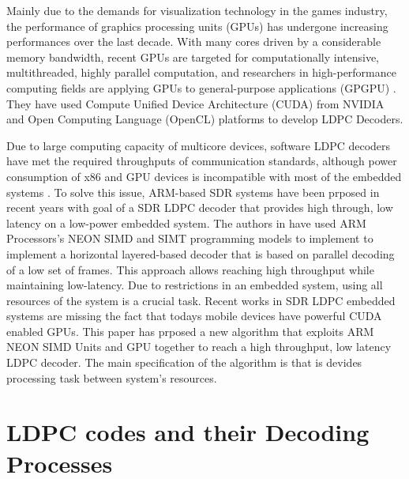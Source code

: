 \documentclass[conference]{IEEEtran}
\begin{document}
Mainly due to the demands for visualization technology in the games industry, the performance of graphics processing units (GPUs) has undergone increasing performances over the last decade. With many cores driven by a considerable memory bandwidth, recent GPUs are targeted for computationally intensive, multithreaded, highly parallel computation, and researchers in high-performance computing fields are applying GPUs to general-purpose applications (GPGPU) \cite{art_gpu_0,art_cuda_openmp, art_memory_coalesced, art_ldpc_OpenCl, art_optimize_0, art_layered1}. They have used Compute Unified Device Architecture (CUDA)
from NVIDIA \cite{website_cuda} and Open Computing Language (OpenCL) platforms to develop LDPC Decoders.

Due to large computing capacity of multicore devices, software LDPC decoders have met the required throughputs of communication standards, although power consumption of x86 and GPU devices is incompatible with most of the embedded systems \cite{art_neon}. To solve this issue, ARM-based SDR systems have been prposed in recent years \cite{art_neon, art_ldpc_cpu0, art_ldpc_OpenCl_1} with goal of a SDR LDPC decoder that provides high through, low latency on a low-power embedded system. The authors in \cite{art_neon} have used ARM Processors's NEON SIMD and SIMT programming models to implement to implement a horizontal layered-based decoder that is based on parallel decoding of a low set of frames. This approach allows reaching high throughput while maintaining low-latency. Due to restrictions in an embedded system, using all resources of the system is a crucial task. Recent works in SDR LDPC embedded systems are missing the fact that todays mobile devices have powerful CUDA enabled GPUs. This paper has prposed a new algorithm that exploits ARM NEON SIMD Units and GPU together to reach a high throughput, low latency LDPC decoder. The main specification of the algorithm is that is devides processing task between system's resources. 

\section{LDPC codes and their Decoding Processes}
\end{document}
